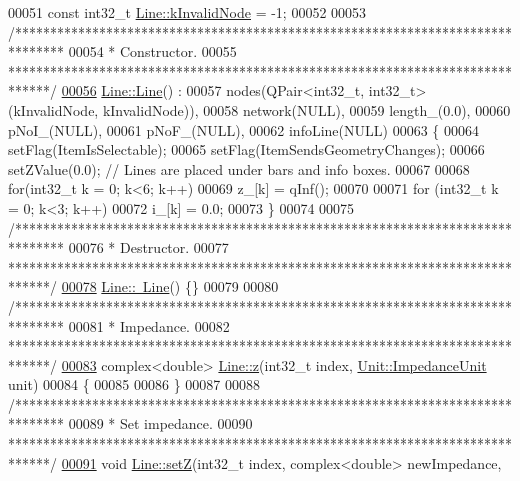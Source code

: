 \begin{DoxyCode}
00051 \textcolor{keyword}{const} int32\_t \hyperlink{group___models_gadc334bd07c6126abc56e531d7e3e72b4}{Line::kInvalidNode} = -1;
00052 
00053 \textcolor{comment}{/*******************************************************************************}
00054 \textcolor{comment}{ * Constructor.}
00055 \textcolor{comment}{ ******************************************************************************/}
\hypertarget{line_8cpp_source_l00056}{}\hyperlink{group___models_gacc11b8a429d8cdd63ba6803dff5602b3}{00056} \hyperlink{group___models_gacc11b8a429d8cdd63ba6803dff5602b3}{Line::Line}() :
00057   nodes(QPair<int32\_t, int32\_t>(kInvalidNode, kInvalidNode)),
00058   network(NULL),
00059   length\_(0.0),
00060   pNoI\_(NULL),
00061   pNoF\_(NULL),
00062   infoLine(NULL)
00063 \{
00064   setFlag(ItemIsSelectable);
00065   setFlag(ItemSendsGeometryChanges);
00066   setZValue(0.0); \textcolor{comment}{// Lines are placed under bars and info boxes.}
00067 
00068   \textcolor{keywordflow}{for}(int32\_t k = 0; k<6; k++)
00069     z\_[k] = qInf();
00070 
00071   \textcolor{keywordflow}{for} (int32\_t k = 0; k<3; k++)
00072     i\_[k] = 0.0;
00073 \}
00074 
00075 \textcolor{comment}{/*******************************************************************************}
00076 \textcolor{comment}{ * Destructor.}
00077 \textcolor{comment}{ ******************************************************************************/}
\hypertarget{line_8cpp_source_l00078}{}\hyperlink{group___models_gaabe85f48d22d92b62257091f48174fac}{00078} \hyperlink{group___models_gaabe85f48d22d92b62257091f48174fac}{Line::~Line}() \{\}
00079 
00080 \textcolor{comment}{/*******************************************************************************}
00081 \textcolor{comment}{ * Impedance.}
00082 \textcolor{comment}{ ******************************************************************************/}
\hypertarget{line_8cpp_source_l00083}{}\hyperlink{group___models_gab5370574fd93e13eb11742f7753fe1f1}{00083} complex<double> \hyperlink{group___models_gab5370574fd93e13eb11742f7753fe1f1}{Line::z}(int32\_t index, \hyperlink{class_unit_a3747e779c805df24a71961290be3fbdf}{Unit::ImpedanceUnit} unit)
00084 \{
00085 
00086 \}
00087 
00088 \textcolor{comment}{/*******************************************************************************}
00089 \textcolor{comment}{ * Set impedance.}
00090 \textcolor{comment}{ ******************************************************************************/}
\hypertarget{line_8cpp_source_l00091}{}\hyperlink{group___models_ga409df7d11f5c5d594a13fb2f74b3b9e0}{00091} \textcolor{keywordtype}{void} \hyperlink{group___models_ga409df7d11f5c5d594a13fb2f74b3b9e0}{Line::setZ}(int32\_t index, complex<double> newImpedance,

\end{DoxyCode}
